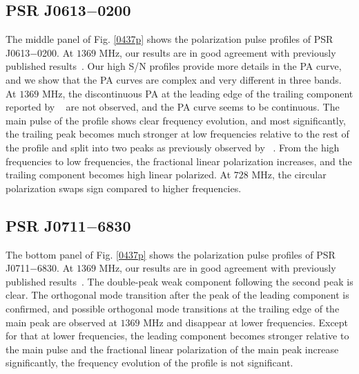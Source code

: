 \documentclass[useAMS,usenatbib]{mn2e}
\begin{document}
\subsection{PSR J0613$-$0200}

The middle panel of Fig. \ref{0437p} shows the polarization pulse profiles of 
PSR J0613$-$0200.
%
At $1369$ MHz, our results are in good agreement with previously published
results~\citep{Ord04,Yan11}. 
%
Our high S/N profiles provide more details in the PA curve, and we show that 
the PA curves are complex and very different in three bands. 
%
At $1369$ MHz, the discontinuous PA at the leading edge of the trailing 
component reported by ~\citet{Yan11} are not observed, and the PA curve seems 
to be continuous.
%
The main pulse of the profile shows clear frequency evolution, and most 
significantly, the trailing peak becomes much stronger at low frequencies 
relative to the rest of the profile and split into two peaks as previously
observed by ~\citet{Stairs99}.
%
From the high frequencies to low frequencies, the fractional linear 
polarization increases, and the trailing component becomes high linear 
polarized. 
%
At $728$ MHz, the circular polarization swaps sign compared to higher 
frequencies.
%


\subsection{PSR J0711$-$6830}

The bottom panel of Fig. \ref{0437p} shows the polarization pulse profiles 
of PSR J0711$-$6830.
%
At $1369$ MHz, our results are in good agreement with previously published
results~\citep{Ord04,Yan11}. 
%
The double-peak weak component following the second peak is clear.
%
The orthogonal mode transition after the peak of the leading component 
is confirmed, and possible orthogonal mode transitions at the trailing edge 
of the main peak are observed at $1369$ MHz and disappear at lower frequencies.
%
Except for that at lower frequencies, the leading component becomes stronger  
relative to the main pulse and the fractional linear polarization of the 
main peak increase significantly, the frequency evolution of the profile 
is not significant.
\end{document}
